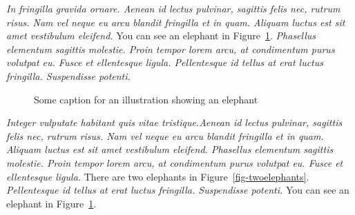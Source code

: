 \documentclass[
  a4paper,
]{scrbook}
\let\oldemph\emph
\renewcommand\emph[1]{\oldemph{\color{gray}#1}}
\begin{document}
\emph{In fringilla gravida ornare. Aenean id lectus pulvinar, sagittis
felis nec, rutrum risus. Nam vel neque eu arcu blandit fringilla et in
quam. Aliquam luctus est sit amet vestibulum eleifend.} You can see an
elephant in Figure~\ref{fig-elephant}. \emph{Phasellus elementum
sagittis molestie. Proin tempor lorem arcu, at condimentum purus
volutpat eu. Fusce et ellentesque ligula. Pellentesque id tellus at erat
luctus fringilla. Suspendisse potenti.}

\begin{figure}


\caption{\label{fig-elephant}Some caption for an illustration showing an
elephant}

\end{figure}%

\emph{Integer vulputate habitant quis vitae tristique.Aenean id lectus
pulvinar, sagittis felis nec, rutrum risus. Nam vel neque eu arcu
blandit fringilla et in quam. Aliquam luctus est sit amet vestibulum
eleifend. Phasellus elementum sagittis molestie. Proin tempor lorem
arcu, at condimentum purus volutpat eu. Fusce et ellentesque ligula.}
There are two elephants in Figure~\ref{fig-twoelephants}.
\emph{Pellentesque id tellus at erat luctus fringilla. Suspendisse
potenti.} You can see an elephant in Figure~\ref{fig-elephant}.
\end{document}
